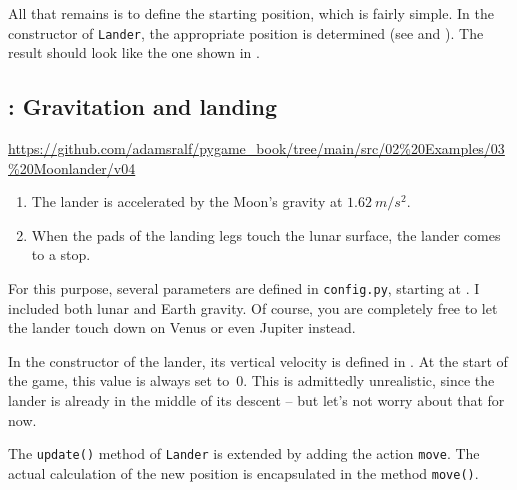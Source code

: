 All that remains is to define the starting position, which is fairly simple. In the constructor of \texttt{Lander}, the appropriate position is determined (see  and ). The result should look like the one shown in .


\newpage
\subsection{: Gravitation and landing}
\begin{diskbox}
	\url{https://github.com/adamsralf/pygame_book/tree/main/src/02%20Examples/03%20Moonlander/v04}
\end{diskbox}

\begin{enumerate}
	\item The lander is accelerated by the Moon’s gravity at $\SI{1.62}{m/s^2}$.\label{reqLanderGravitation}
	\item When the pads of the landing legs touch the lunar surface, the lander comes to a stop. \label{reqLanderAufsetzen}
\end{enumerate}
\er

For this purpose, several parameters are defined in \texttt{config.py}, starting at . I included both lunar and Earth gravity. Of course, you are completely free to let the lander touch down on Venus or even Jupiter instead.


In the constructor of the lander, its vertical velocity is defined in . At the start of the game, this value is always set to~0. This is admittedly unrealistic, since the lander is already in the middle of its descent -- but let’s not worry about that for now.


The \texttt{update()} method of \texttt{Lander} is extended by adding the action \texttt{move}. The actual calculation of the new position is encapsulated in the method \texttt{move()}.

